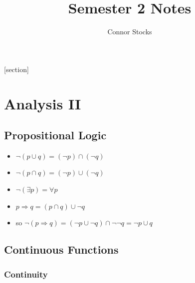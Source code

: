 \documentclass{article}
\title{Semester 2 Notes}
\author{Connor Stocks}
\begin{document}
[section]
\newcommand{\equationref}{\stepcounter{eq}\arabic{section}.\arabic{eq}}
\newcommand{\tagequation}[1]{\[\tag{\equationref}#1\]}

\hypersetup{
    colorlinks,
    citecolor=black,
    filecolor=black,
    linkcolor=black,
    urlcolor=black
}

\maketitle

\newpage
\tableofcontents


\newpage
\section{Analysis II}
\subsection{Propositional Logic}




\begin{itemize}
    \item \(\lnot(p\cup q) = (\lnot p)\cap(\lnot q)\)
    \item \(\lnot(p\cap q) = (\lnot p)\cup(\lnot q)\)
    \item \(\lnot(\exists p) = \forall p\)
    \item \(p \Rightarrow q = (p\cap q)\cup \lnot q\)
    \item so \(\lnot (p\Rightarrow q) = (\lnot p \cup\lnot q)\cap \lnot\lnot q = \lnot p\cup q\)
\end{itemize}

\subsection{Continuous Functions}

\subsubsection*{Continuity}
\end{document}
